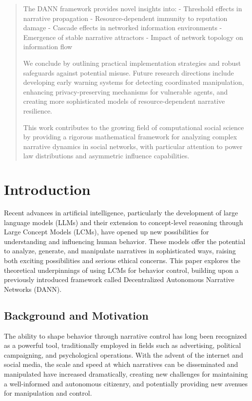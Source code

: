 \documentclass[12pt, a4paper]{article}
\begin{document}
\begin{abstract}
The DANN framework provides novel insights into:
- Threshold effects in narrative propagation
- Resource-dependent immunity to reputation damage
- Cascade effects in networked information environments
- Emergence of stable narrative attractors
- Impact of network topology on information flow

We conclude by outlining practical implementation strategies and robust safeguards against potential misuse. Future research directions include developing early warning systems for detecting coordinated manipulation, enhancing privacy-preserving mechanisms for vulnerable agents, and creating more sophisticated models of resource-dependent narrative resilience.

This work contributes to the growing field of computational social science by providing a rigorous mathematical framework for analyzing complex narrative dynamics in social networks, with particular attention to power law distributions and asymmetric influence capabilities.
\end{abstract}

\section{Introduction}

Recent advances in artificial intelligence, particularly the development of large language models (LLMs) and their extension to concept-level reasoning through Large Concept Models (LCMs), have opened up new possibilities for understanding and influencing human behavior. These models offer the potential to analyze, generate, and manipulate narratives in sophisticated ways, raising both exciting possibilities and serious ethical concerns. This paper explores the theoretical underpinnings of using LCMs for behavior control, building upon a previously introduced framework called Decentralized Autonomous Narrative Networks (DANN).

\subsection{Background and Motivation}

The ability to shape behavior through narrative control has long been recognized as a powerful tool, traditionally employed in fields such as advertising, political campaigning, and psychological operations. With the advent of the internet and social media, the scale and speed at which narratives can be disseminated and manipulated have increased dramatically, creating new challenges for maintaining a well-informed and autonomous citizenry, and potentially providing new avenues for manipulation and control.
\end{document}
